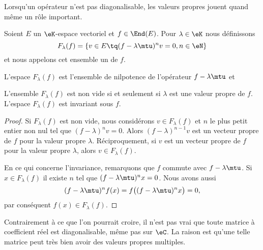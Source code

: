 
Lorsqu'un opérateur n'est pas diagonalisable, les valeurs propres jouent quand même un rôle important.

\begin{definition}  \label{DefFBNIooCGbIix}
	Soient \( E\) un \( \eK\)-espace vectoriel et \( f\in\End(E)\). Pour \( \lambda\in \eK\) nous définissons
	\begin{equation}
		F_{\lambda}(f)=\{ v\in E\tq (f-\lambda\mtu)^nv=0, n\in\eN \}
	\end{equation}
	et nous appelons cet ensemble un  de \( f\).
\end{definition}
L'espace \( F_{\lambda}(f)\) est l'ensemble de nilpotence de l'opérateur \( f-\lambda\mtu\) et

\begin{lemma}   \label{LemBLPooHMAoyJ}
	L'ensemble \( F_{\lambda}(f)\) est non vide si et seulement si \( \lambda\) est une valeur propre de \( f\). L'espace \( F_{\lambda}(f)\) est invariant sous \( f\).
\end{lemma}

\begin{proof}
	Si \( F_{\lambda}(f)\) est non vide, nous considérons \( v\in F_{\lambda}(f)\) et \( n\) le plus petit entier non nul tel que \( (f-\lambda)^nv=0\). Alors \( (f-\lambda)^{n-1}v\) est un vecteur propre de \( f\) pour la valeur propre \( \lambda\). Réciproquement, si \( v\) est un vecteur propre de \( f\) pour la valeur propre \( \lambda\), alors \( v\in F_{\lambda}(f)\).

	En ce qui concerne l'invariance, remarquons que \( f\) commute avec \( f-\lambda\mtu\). Si \( x\in F_{\lambda}(f)\) il existe \( n\) tel que \( (f-\lambda\mtu)^nx=0\). Nous avons aussi
	\begin{equation}
		(f-\lambda\mtu)^nf(x)=f\big( (f-\lambda\mtu)^nx \big)=0,
	\end{equation}
	par conséquent \( f(x)\in F_{\lambda}(f)\).
\end{proof}

Contrairement à ce que l'on pourrait croire, il n'est pas vrai que toute matrice à coefficient réel est diagonalisable, même pas sur \( \eC\). La raison est qu'une telle matrice peut très bien avoir des valeurs propres multiples.

